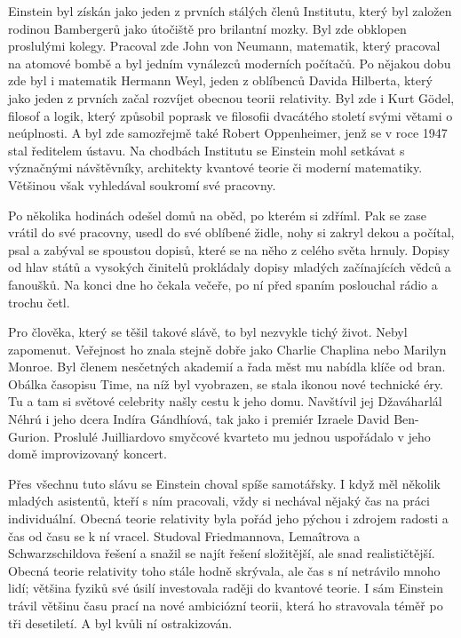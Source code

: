   Einstein byl získán jako jeden z prvních stálých členů Institutu, který byl založen rodinou
  Bambergerů jako útočiště pro brilantní mozky. Byl zde obklopen proslulými kolegy. Pracoval zde
  John von Neumann, matematik, který pracoval na atomové bombě a byl jedním vynálezců moderních
  počítačů. Po nějakou dobu zde byl i matematik Hermann Weyl, jeden z oblíbenců Davida Hilberta,
  který jako jeden z prvních začal rozvíjet obecnou teorii relativity. Byl zde i Kurt Gödel, filosof
  a logik, který způsobil poprask ve filosofii dvacátého století svými větami o neúplnosti. A byl
  zde samozřejmě také Robert Oppenheimer, jenž se v roce 1947 stal ředitelem ústavu. Na chodbách
  Institutu se Einstein mohl setkávat s význačnými návštěvníky, architekty kvantové teorie či
  moderní matematiky. Většinou však vyhledával soukromí své pracovny. 
  
  Po několika hodinách odešel domů na oběd, po kterém si zdříml. Pak se zase vrátil do své pracovny,
  usedl do své oblíbené židle, nohy si zakryl dekou a počítal, psal a zabýval se spoustou dopisů,
  které se na něho z celého světa hrnuly. Dopisy od hlav států a vysokých činitelů prokládaly dopisy
  mladých začínajících vědců a fanoušků. Na konci dne ho čekala večeře, po ní před spaním poslouchal
  rádio a trochu četl. 
  
  Pro člověka, který se těšil takové slávě, to byl nezvykle tichý život. Nebyl zapomenut. Veřejnost
  ho znala stejně dobře jako Charlie Chaplina nebo Marilyn Monroe. Byl členem nesčetných akademií a
  řada měst mu nabídla klíče od bran. Obálka časopisu Time, na níž byl vyobrazen, se stala ikonou
  nové technické éry. Tu a tam si světové celebrity našly cestu k jeho domu. Navštívil jej
  Džaváharlál Néhrú i jeho dcera Indíra Gándhíová, tak jako i premiér Izraele David Ben-Gurion.
  Proslulé Juilliardovo smyčcové kvarteto mu jednou uspořádalo v jeho domě improvizovaný koncert.
  
  Přes všechnu tuto slávu se Einstein choval spíše samotářsky. I když měl několik mladých asistentů,
  kteří s ním pracovali, vždy si nechával nějaký čas na práci individuální. Obecná teorie relativity
  byla pořád jeho pýchou i zdrojem radosti a čas od času se k ní vracel. Studoval Friedmannova,
  Lemaîtrova a Schwarzschildova řešení a snažil se najít řešení složitější, ale snad realističtější.
  Obecná teorie relativity toho stále hodně skrývala, ale čas s ní netrávilo mnoho lidí; většina
  fyziků své úsilí investovala raději do kvantové teorie. I sám Einstein trávil většinu času prací
  na nové ambiciózní teorii, která ho stravovala téměř po tři desetiletí. A byl kvůli ní
  ostrakizován. 
  
